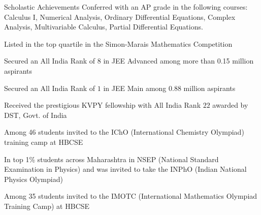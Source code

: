 \begin{rubric}{Scholastic Achievements}
    \entry*[2020-2024] Conferred with an AP grade in the following courses: Calculus I, Numerical Analysis, Ordinary Differential Equations, Complex Analysis, Multivariable Calculus, Partial Differential Equations.

    \entry*[2022, 2023] Listed in the top quartile in the Simon-Marais Mathematics Competition

    \entry*[2020] Secured an All India Rank of $8$ in JEE Advanced among more than 0.15 million aspirants

    \entry*[2020] Secured an All India Rank of $1$ in JEE Main among 0.88 million aspirants

	\entry*[2020] Received the prestigious KVPY fellowship with All India Rank $22$ awarded by DST, Govt. of India

    \entry*[2020] Among 46 students invited to the IChO (International Chemistry Olympiad) training camp at HBCSE

    \entry*[2019, 2020] In top 1\% students across Maharashtra in NSEP (National Standard Examination in Physics) and was invited to take the INPhO (Indian National Physics Olympiad)

	\entry*[2018] Among 35 students invited to the IMOTC (International Mathematics Olympiad Training Camp) at HBCSE
\end{rubric}